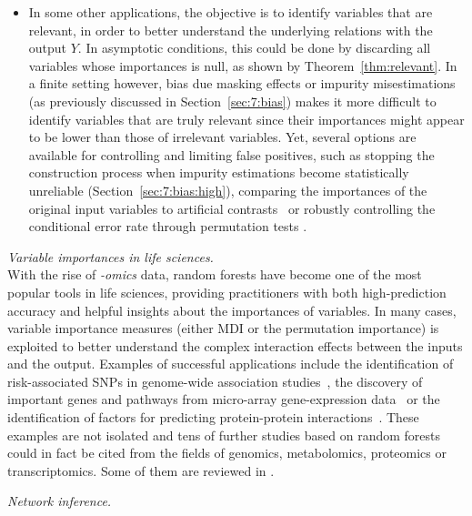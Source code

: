 \begin{description}
\begin{itemize}
    \item In some other applications, the objective is to identify variables
          that are relevant, in order to better understand the underlying
          relations with the output $Y$. In asymptotic conditions, this could
          be done by discarding all variables whose importances is null, as shown by Theorem~\ref{thm:relevant}.
          In a finite setting however, bias due masking effects or impurity misestimations (as previously discussed in Section~\ref{sec:7:bias})
          makes it more difficult to identify variables that are truly
          relevant since their importances might appear to be lower than those of irrelevant variables. Yet, several options
          are available for controlling and limiting false positives,
          such as stopping the construction process when impurity
          estimations become statistically unreliable (Section~\ref{sec:7:bias:high}), comparing the importances
          of the original input variables to artificial contrasts~\citep{tuv:2006}
          or robustly controlling the conditional error rate through permutation
          tests \citep{van:2008}.
    \end{itemize}

\item \textit{Variable importances in life sciences.} \hfill \\
    With the rise of \textit{-omics} data, random forests have become one of
    the most popular tools in life sciences, providing practitioners with both
    high-prediction accuracy and helpful insights about the importances of
    variables. In many cases, variable importance measures (either MDI or the
    permutation importance) is exploited to better understand the complex
    interaction effects between the inputs and the output. Examples of
    successful applications include the identification of risk-associated SNPs
    in genome-wide association
    studies~\citep{lunetta:2004,meng:2009,botta:2014}, the discovery of
    important genes and pathways from micro-array gene-expression
    data~\citep{pang:2006,chang:2008} or the identification of factors for
    predicting protein-protein interactions~\citep{qi:2006}. These examples are
    not isolated and tens of further studies based on random forests could in
    fact be cited from the fields of genomics, metabolomics, proteomics or
    transcriptomics. Some of them are reviewed in
    \citep{touw:2013,boulesteix:2012}.

\item \textit{Network inference.} \hfill \\
    \todo{}

\end{description}
